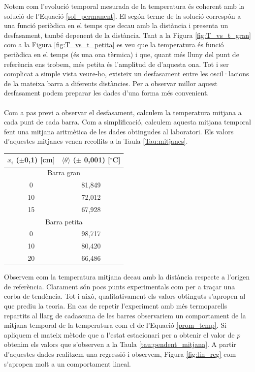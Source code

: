 \documentclass[12pt,twosides,onecolumn,openany]{article}
\newenvironment{Figura}
  {\par\medskip\noindent\minipage{\linewidth}}
  {\endminipage\par\medskip}
\begin{document}
\begin{multicols}{2}
\begin{Figura}
  \label{fig:T_vs_t_petita}
\end{Figura}
Notem com l'evolució temporal mesurada de la temperatura és coherent amb la solució de l'Equació \eqref{sol_permanent}. El segón terme de la solució correspón a una funció periòdica en el temps que decau amb la distància i presenta un desfasament, també depenent de la distància. Tant a la Figura \ref{fig:T_vs_t_gran} com a la Figura \ref{fig:T_vs_t_petita} es veu que la temperatura és funció periòdica en el temps (és una ona tèrmica) i que, quant més lluny del punt de referència ens trobem, més petita és l'amplitud de d'aquesta ona. Tot i ser complicat a simple vista veure-ho, existeix un desfasament entre les oscil·lacions de la mateixa barra a diferents distàncies. Per a observar millor aquest desfasament podem preparar les dades d'una forma més convenient.\\\\
Com a pas previ a observar el desfasament, calculem la temperatura mitjana a cada punt de cada barra. Com a simplificació, calculem aquesta mitjana temporal fent una mitjana aritmètica de les dades obtingudes al laboratori. Els valors d'aquestes mitjanes venen recollits a la Taula \ref{Tau:mitjanes}.
\begin{Figura}
  \centering
  \begin{tabular}{c|c}
    $x_i$ ($\pm$0,1) [cm] & $\langle \theta \rangle$ ($\pm$ 0,001) [$^\circ$C]\\
    \hline 
    \multicolumn{2}{c}{Barra gran} \\ \hline
    0 & 81,849\\
    10 & 72,012\\
    15 & 67,928 \\ \hline
    \multicolumn{2}{c}{Barra petita} \\ \hline
    0 & 98,717\\
    10 & 80,420\\
    20 & 66,486 \\
  \end{tabular}
  \label{Tau:mitjanes}
\end{Figura}
Observem com la temperatura mitjana decau amb la distància respecte a l'origen de referència. Clarament són pocs punts experimentals com per a traçar una corba de tendència. Tot i això, qualitativament els valors obtinguts s'apropen al que prediu la teoria. En cas de repetir l'experiment amb més termoparells repartits al llarg de cadascuna de les barres observariem un comportament de la mitjana temporal de la temperatura com el de l'Equació \eqref{prom_temp}. Si apliquem el mateix mètode que a l'estat estacionari per a obtenir el valor de $p$ obtenim els valors que s'observen a la Taula \ref{tau:pendent_mitjana}. A partir d'aquestes dades realitzem una regressió i observem, Figura \ref{fig:lin_reg} com s'apropen molt a un comportament lineal.

\end{multicols}
\end{document}
